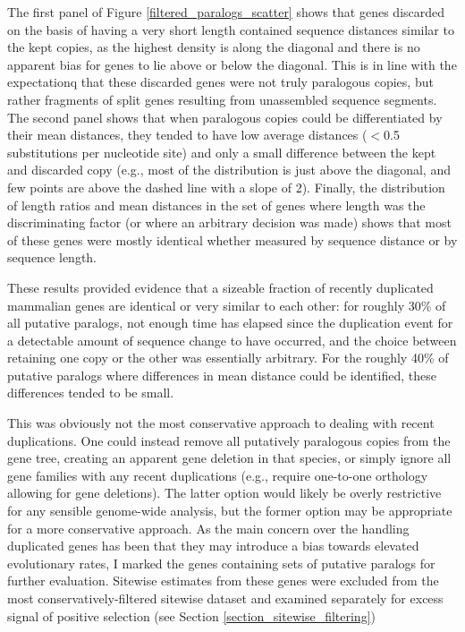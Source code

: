 The first panel of Figure \ref{filtered_paralogs_scatter} shows that
genes discarded on the basis of having a very short length contained
sequence distances similar to the kept copies, as the highest density
is along the diagonal and there is no apparent bias for genes to lie
above or below the diagonal. This is in line with the expectationq
that these discarded genes were not truly paralogous copies, but
rather fragments of split genes resulting from unassembled sequence
segments. The second panel shows that when paralogous copies could be
differentiated by their mean distances, they tended to have low
average distances ($<$0.5 substitutions per nucleotide site) and only
a small difference between the kept and discarded copy (e.g., most of
the distribution is just above the diagonal, and few points are above
the dashed line with a slope of 2). Finally, the distribution of
length ratios and mean distances in the set of genes where length was
the discriminating factor (or where an arbitrary decision was made)
shows that most of these genes were mostly identical whether measured
by sequence distance or by sequence length.

These results provided evidence that a sizeable fraction of recently
duplicated mammalian genes are identical or very similar to each
other: for roughly 30\% of all putative paralogs, not enough time has
elapsed since the duplication event for a detectable amount of
sequence change to have occurred, and the choice between retaining one
copy or the other was essentially arbitrary. For the roughly 40\% of
putative paralogs where differences in mean distance could be
identified, these differences tended to be small.

This was obviously not the most conservative approach to dealing with
recent duplications. One could instead remove all putatively
paralogous copies from the gene tree, creating an apparent gene
deletion in that species, or simply ignore all gene families with any
recent duplications (e.g., require one-to-one orthology allowing for
gene deletions). The latter option would likely be overly restrictive
for any sensible genome-wide analysis, but the former option may be
appropriate for a more conservative approach. As the main concern over
the handling duplicated genes has been that they may introduce a bias
towards elevated evolutionary rates, I marked the genes containing
sets of putative paralogs for further evaluation. Sitewise estimates
from these genes were excluded from the most conservatively-filtered
sitewise dataset and examined separately for excess signal of positive
selection (see Section \ref{section_sitewise_filtering})

